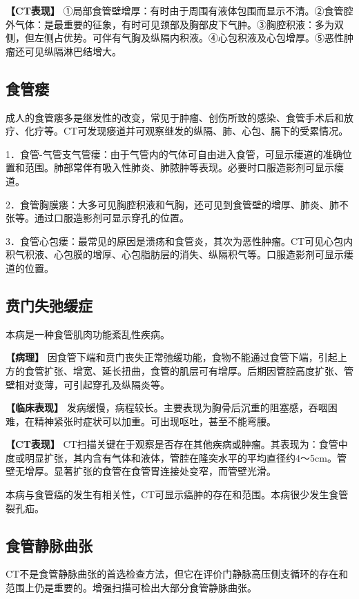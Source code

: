 \textbf{【CT表现】}
①局部食管壁增厚：有时由于周围有液体包围而显示不清。②食管腔外气体：是最重要的征象，有时可见颈部及胸部皮下气肿。③胸腔积液：多为双侧，但左侧占优势。可伴有气胸及纵隔内积液。④心包积液及心包增厚。⑤恶性肿瘤还可见纵隔淋巴结增大。

\subsection{食管瘘}

成人的食管瘘多是继发性的改变，常见于肿瘤、创伤所致的感染、食管手术后和放疗、化疗等。CT可发现瘘道并可观察继发的纵隔、肺、心包、膈下的受累情况。

1．食管-气管支气管瘘：由于气管内的气体可自由进入食管，可显示瘘道的准确位置和范围。肺部常伴有吸入性肺炎、肺脓肿等表现。必要时口服造影剂可显示瘘道。

2．食管胸膜瘘：大多可见胸腔积液和气胸，还可见到食管壁的增厚、肺炎、肺不张等。通过口服造影剂可显示穿孔的位置。

3．食管心包瘘：最常见的原因是溃疡和食管炎，其次为恶性肿瘤。CT可见心包内积气积液、心包膜的增厚、心包脂肪层的消失、纵隔积气等。口服造影剂可显示瘘道的位置。

\subsection{贲门失弛缓症}

本病是一种食管肌肉功能紊乱性疾病。

\textbf{【病理】}
因食管下端和贲门丧失正常弛缓功能，食物不能通过食管下端，引起上方的食管扩张、增宽、延长扭曲，食管的肌层可有增厚。后期因管腔高度扩张、管壁相对变薄，可引起穿孔及纵隔炎等。

\textbf{【临床表现】}
发病缓慢，病程较长。主要表现为胸骨后沉重的阻塞感，吞咽困难，在精神紧张时症状可以加重。可出现呕吐，甚至不能弯腰。

\textbf{【CT表现】}
CT扫描关键在于观察是否存在其他疾病或肿瘤。其表现为：食管中度或明显扩张，其内含有气体和液体，管腔在隆突水平的平均直径约4～5cm。管壁无增厚。显著扩张的食管在食管胃连接处变窄，而管壁光滑。

本病与食管癌的发生有相关性，CT可显示癌肿的存在和范围。本病很少发生食管裂孔疝。

\subsection{食管静脉曲张}

CT不是食管静脉曲张的首选检查方法，但它在评价门静脉高压侧支循环的存在和范围上仍是重要的。增强扫描可检出大部分食管静脉曲张。


